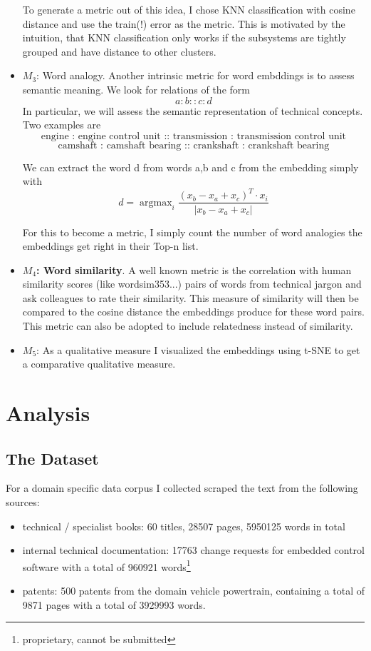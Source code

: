 \documentclass[10pt,a4paper]{article}
\DeclareMathOperator*{\argmax}{argmax} %
\begin{document}
\begin{itemize}
		To generate a metric out of this idea, I chose KNN classification with cosine distance and use the train(!) error as the metric. This is motivated by the intuition, that KNN classification only works if the subsystems are tightly grouped and have distance to other clusters. 

		
		\item \textbf{$M_3$}: Word analogy. Another intrinsic metric for word embddings is to assess semantic meaning. We look for relations of the form
		$$ a:b::c:d $$
		In particular, we will assess the semantic representation of technical concepts. Two examples are 
		$$\text{engine : engine control unit :: transmission : transmission control unit}$$
		$$\text{camshaft : camshaft bearing :: crankshaft : crankshaft bearing}$$
		
		We can extract the word d from words a,b and c from the embedding simply with
		\begin{equation}
		d=\argmax_{i} \frac{(x_b -x_a + x_c)^T\cdot x_i}{|x_b-x_a+x_c|}
		\end{equation}
		
		For this to become a metric, I simply count the number of word analogies the embeddings get right in their Top-n list. 
		
		
		
		\item \textbf{$M_4$: Word similarity}. A well known metric is the correlation with human similarity scores (like wordsim353...) pairs of words from technical jargon and ask colleagues to rate their similarity. This measure of similarity will then be compared to the cosine distance the embeddings produce for these word pairs. This metric can also be adopted to include relatedness instead of similarity.
		
		\item \textbf{$M_5$}: As a qualitative measure I visualized the embeddings using t-SNE \cite{vanDerMaaten2008} to get a comparative qualitative measure.
		
	\end{itemize}
	
	\section{Analysis}
	\subsection{The Dataset}
	
	For a domain specific data corpus I collected scraped the text from the following sources:
	\begin{itemize}
		\item technical / specialist books: 60 titles, 28507 pages, 5950125 words in total 
		\item internal technical documentation: 17763 change requests for embedded control software with a total of 960921 words\footnote{proprietary, cannot be submitted} 
		\item patents: 500 patents from the domain vehicle powertrain, containing a total of 9871 pages with a total of 3929993 words.
	\end{itemize}
	
\end{document}
